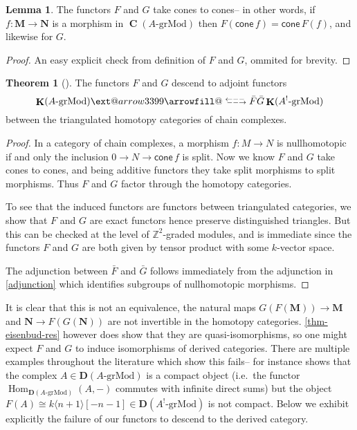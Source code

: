 \documentclass[a4paper]{article}
\makeatletter
\theoremstyle{definition}
\newtheorem{theorem}[defn]{Theorem}
\newtheorem{lemma}[defn]{Lemma}
\theoremstyle{remark}
\newcommand{\leftrarrows}{\mathrel{\raise.75ex\hbox{\oalign{%
  $\scriptstyle\leftarrow$\cr
  \vrule width0pt height.5ex$\hfil\scriptstyle\relbar$\cr}}}}
\newcommand{\lrightarrows}{\mathrel{\raise.75ex\hbox{\oalign{%
  $\scriptstyle\relbar$\hfil\cr
  $\scriptstyle\vrule width0pt height.5ex\smash\rightarrow$\cr}}}}
\newcommand{\Rrelbar}{\mathrel{\raise.75ex\hbox{\oalign{%
  $\scriptstyle\relbar$\cr
  \vrule width0pt height.5ex$\scriptstyle\relbar$}}}}
\def\leftrightarrowsfill@{\arrowfill@\leftrarrows\Rrelbar\lrightarrows}
\newcommand{\xleftrightarrows}[2][]{\ext@arrow 3399\leftrightarrowsfill@{#1}{#2}}
\newcommand{\grMod}{\ensuremath{\text{-grMod}}}
\DeclareMathOperator{\Hom}{\text{Hom}}
\DeclareMathOperator{\Ch}{\mathbf{C}}
\DeclareMathOperator{\kom}{{\mathbf{K}}}
\newcommand{\deri}{\mathbf{D}}
\makeatother
\begin{document}
\begin{lemma}
    The functors \(F\) and \(G\) take cones to cones-- in other words, if
    \(f:\mathbf{M}\rightarrow\mathbf{N}\) is a morphism in \(\Ch(A\grMod)\)
    then \(F(\mathsf{cone}\,f)=\mathsf{cone}\,F(f)\), and likewise for \(G\).
    \begin{proof} 
        An easy explicit check from definition of \(F\) and \(G\), ommited for
        brevity.
    \end{proof}
\end{lemma}

\begin{theorem}[\cite{eisenbud_sheaf_2003}]
    The functors \(F\) and \(G\) descend to adjoint functors
    \[ \kom(A\grMod) \xleftrightarrows[\bar F]{\bar G} \kom(A^!\grMod)\]
    between the triangulated homotopy categories of chain complexes.
    \begin{proof}
        In a category of chain complexes, a morphism \(f:M\rightarrow N\) is
        nullhomotopic if and only the inclusion \(0\rightarrow N\rightarrow
        \mathsf{cone}\,f\) is split. Now we know \(F\) and \(G\) take cones to
        cones, and being additive functors they take split morphisms to split
        morphisms. Thus \(F\) and \(G\) factor through the homotopy categories.
        
        To see that the induced functors are functors between triangulated
        categories, we show that \(F\) and \(G\) are exact functors hence
        preserve distinguished triangles. But this can be checked at the level
        of \(\mathbb{Z}^2\)-graded modules, and is immediate since the functors
        \(F\) and \(G\) are both given by tensor product with some \(k\)-vector
        space.

        The adjunction between \(\bar F\) and \(\bar G\) follows immediately
        from the adjunction in \cref{adjunction} which identifies
        subgroups of nullhomotopic morphisms.
    \end{proof}
\end{theorem}

It is clear that this is not an equivalence, the natural maps
\(G(F(\mathbf{M}))\rightarrow \mathbf{M}\) and \(\mathbf{N}\rightarrow
F(G(\mathbf{N}))\) are not invertible in the homotopy categories.
\cref{thm-eisenbud-res} however does show that they are quasi-isomorphisms, so
one might expect \({F}\) and \({G}\) to induce isomorphisms of derived
categories. There are multiple examples throughout the literature which show
this fails-- for instance \cite{keller_koszul_2003} shows that the
complex \(A\in \deri(A\grMod)\) is a compact object (i.e.\ the functor
\(\Hom_{\deri(A\grMod)}(A,-)\) commutes with infinite direct sums) but the
object \(F(A)\cong k\langle n+1 \rangle[-n-1]\in \deri(A^!\grMod)\) is not
compact. Below we exhibit explicitly the failure of our functors to descend to
the derived category.
\end{document}
